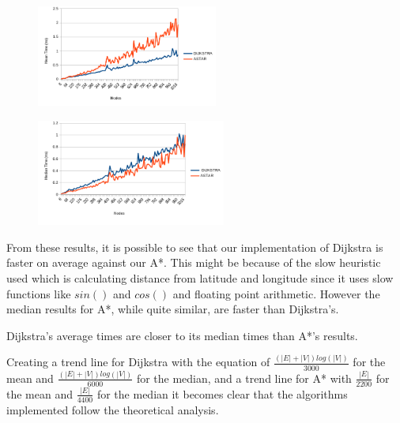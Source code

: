 \documentclass[a4paper, 12pt]{report}
\begin{document}
    \begin{figure}[H]
    \centering
    \begin{minipage}{.47\textwidth}
      \centering
      \includegraphics[width = 225px]{img/pathfindingmean.png}
      \label{fig:pathmean}
    \end{minipage}%
    \hspace{.03\textwidth} 
    \begin{minipage}{.47\textwidth}
    \centering
      \includegraphics[width = 235px]{img/pathfindingmedian.png}
      \label{fig:pathmedian}
    \end{minipage}
    \end{figure}
    
    From these results, it is possible to see that our implementation of Dijkstra is faster on average against our A*. This might be because of the slow heuristic used which is calculating distance from latitude and longitude since it uses slow functions like $sin()$ and $cos()$ and floating point arithmetic. However the median results for A*, while quite similar, are faster than Dijkstra's.
    
    Dijkstra's average times are closer to its median times than A*'s results.
    
    Creating a trend line for Dijkstra with the equation of $\frac{(|E|+|V|)log(|V|)}{3000}$ for the mean and $\frac{(|E|+|V|)log(|V|)}{6000}$ for the median, and a trend line for A* with $\frac{|E|}{2200}$ for the mean and $\frac{|E|}{4400}$ for the median it becomes clear that the algorithms implemented follow the theoretical analysis.
        
\end{document}
